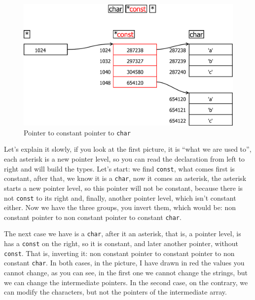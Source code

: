 \documentclass[a4paper]{article}
\begin{document}
\begin{figure}[H]
    \includegraphics[width=\linewidth]{char_pointer_const_pointer}
    \caption{Pointer to constant pointer to \texttt{char}}
    \label{img:charconstpointerpointer}
\end{figure}

Let's explain it slowly, if you look at the first picture, it is ``what we are
used to'', each asterisk is a new pointer level, so you can read the declaration
from left to right and will build the types. Let's start: we find \verb"const",
what comes first is constant, after that, we know it is a \verb!char!, now it
comes an asterisk, the asterisk starts a new pointer level, so this pointer will
not be constant, because there is not \verb!const! to its right and, finally,
another pointer level, which isn't constant either. Now we have the three
groups, you invert them, which would be: non constant pointer to non constant
pointer to constant \verb!char!.

The next case we have is a \verb!char!, after it an asterisk, that is, a pointer
level, is has a \verb"const" on the right, so it is constant, and later another
pointer, without \verb"const". That is, inverting it: non constant pointer to
constant pointer to non constant \verb"char". In both cases, in the picture, I
have drawn in red the values you cannot change, as you can see, in the first one
we cannot change the strings, but we can change the intermediate pointers. In
the second case, on the contrary, we can modify the characters, but not the
pointers of the intermediate array.
\end{document}
